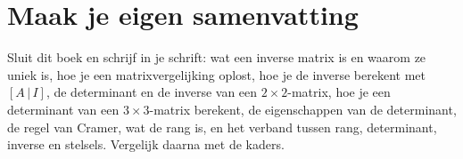 
\ifzelfstudie
\section*{Maak je eigen samenvatting}
Sluit dit boek en schrijf in je schrift: wat een inverse matrix is en waarom ze uniek is, hoe je een matrixvergelijking oplost, hoe je de inverse berekent met $[A \,|\, I]$, de determinant en de inverse van een $2 \times 2$-matrix, hoe je een determinant van een $3 \times 3$-matrix berekent, de eigenschappen van de determinant, de regel van Cramer, wat de rang is, en het verband tussen rang, determinant, inverse en stelsels. Vergelijk daarna met de kaders.
\fi
